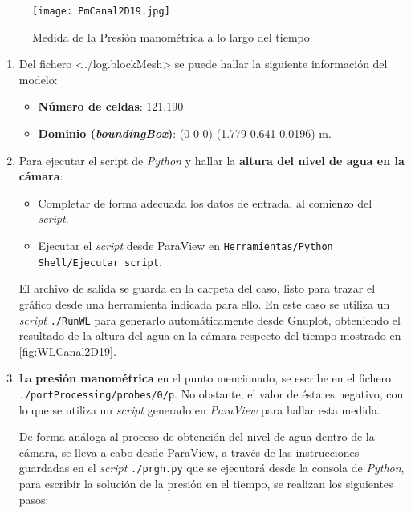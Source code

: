 \begin{figure}
\centering
\texttt{[image: PmCanal2D19.jpg]}
\caption{Medida de la Presión manométrica a lo largo del tiempo}
\label{fig:PmCanal2D19}
\end{figure}

\begin{enumerate}
\def\labelenumi{\arabic{enumi}.}
\item
  Del fichero \textless{}./log.blockMesh\textgreater{} se puede hallar la siguiente información del modelo:

  \begin{itemize}
  \item
    \textbf{Número de celdas}: 121.190
  \item
    \textbf{Dominio (\emph{boundingBox})}: (0 0 0) (1.779 0.641
    0.0196) m.
  \end{itemize}
\item
  Para ejecutar el script de \emph{Python} y hallar la \textbf{altura del nivel
  de agua en la cámara}:

  \begin{itemize}
  \item
    Completar de forma adecuada los datos de entrada, al comienzo del
    \emph{script}.
  \item
    Ejecutar el \emph{script} desde ParaView en
    \lstinline[style=bash]{Herramientas/Python Shell/Ejecutar script}.
  \end{itemize}

  El archivo de salida se guarda en la carpeta del caso, listo para
  trazar el gráfico desde una herramienta indicada para ello. En este
  caso se utiliza un \emph{script} \lstinline[style=bash]{./RunWL} para
  generarlo automáticamente desde Gnuplot, obteniendo el resultado de la altura del agua en la cámara respecto del tiempo mostrado en \autoref{fig:WLCanal2D19}.

\item
  La \textbf{presión manométrica} en el punto mencionado, se escribe en el
  fichero \lstinline[style=bash]{./portProcessing/probes/0/p}. No
  obstante, el valor de ésta es negativo, con lo que se utiliza un
  \emph{script} generado en \emph{ParaView} para hallar esta medida.

  De forma análoga al proceso de obtención del nivel de agua dentro de
  la cámara, se lleva a cabo desde ParaView, a través de las instrucciones guardadas en el
  \emph{script} \lstinline[style=bash]{./prgh.py} que se ejecutará desde la consola de \emph{Python}, para escribir la solución de la presión en el tiempo, se realizan los siguientes pasos:  


\end{enumerate}
